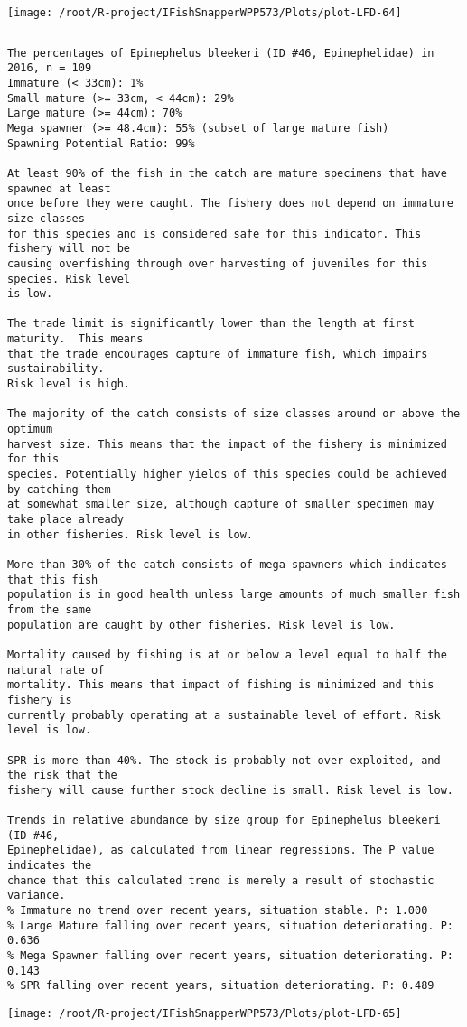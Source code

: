 \documentclass{report}\usepackage[]{graphicx}\usepackage[]{color}
\makeatletter
\def\maxwidth{ %
  \ifdim\Gin@nat@width>\linewidth
    \linewidth
  \else
    \Gin@nat@width
  \fi
}
\newenvironment{kframe}{%
 \def\at@end@of@kframe{}%
 \ifinner\ifhmode%
  \def\at@end@of@kframe{\end{minipage}}%
  \begin{minipage}{\columnwidth}%
 \fi\fi%
 \def\FrameCommand##1{\hskip\@totalleftmargin \hskip-\fboxsep
 \colorbox{shadecolor}{##1}\hskip-\fboxsep
     \hskip-\linewidth \hskip-\@totalleftmargin \hskip\columnwidth}%
 \MakeFramed {\advance\hsize-\width
   \@totalleftmargin\z@ \linewidth\hsize
   \@setminipage}}%
 {\par\unskip\endMakeFramed%
 \at@end@of@kframe}
\newenvironment{knitrout}{}{} %
\makeatother
\begin{document}
\begin{knitrout}
\texttt{[image: /root/R-project/IFishSnapperWPP573/Plots/plot-LFD-64]} 
\begin{kframe}\begin{verbatim}
\end{verbatim}
\end{kframe}
\clearpage
\newpage
\begin{kframe}\begin{verbatim}The percentages of Epinephelus bleekeri (ID #46, Epinephelidae) in 2016, n = 109
Immature (< 33cm): 1%
Small mature (>= 33cm, < 44cm): 29%
Large mature (>= 44cm): 70%
Mega spawner (>= 48.4cm): 55% (subset of large mature fish)
Spawning Potential Ratio: 99%
 
At least 90% of the fish in the catch are mature specimens that have spawned at least
once before they were caught. The fishery does not depend on immature size classes
for this species and is considered safe for this indicator. This fishery will not be
causing overfishing through over harvesting of juveniles for this species. Risk level
is low.

The trade limit is significantly lower than the length at first maturity.  This means
that the trade encourages capture of immature fish, which impairs sustainability.
Risk level is high.

The majority of the catch consists of size classes around or above the optimum
harvest size. This means that the impact of the fishery is minimized for this
species. Potentially higher yields of this species could be achieved by catching them
at somewhat smaller size, although capture of smaller specimen may take place already
in other fisheries. Risk level is low.

More than 30% of the catch consists of mega spawners which indicates that this fish
population is in good health unless large amounts of much smaller fish from the same
population are caught by other fisheries. Risk level is low.
 
Mortality caused by fishing is at or below a level equal to half the natural rate of
mortality. This means that impact of fishing is minimized and this fishery is
currently probably operating at a sustainable level of effort. Risk level is low.
 
SPR is more than 40%. The stock is probably not over exploited, and the risk that the
fishery will cause further stock decline is small. Risk level is low.
 
Trends in relative abundance by size group for Epinephelus bleekeri (ID #46,
Epinephelidae), as calculated from linear regressions. The P value indicates the
chance that this calculated trend is merely a result of stochastic variance.
% Immature no trend over recent years, situation stable. P: 1.000
% Large Mature falling over recent years, situation deteriorating. P: 0.636
% Mega Spawner falling over recent years, situation deteriorating. P: 0.143
% SPR falling over recent years, situation deteriorating. P: 0.489
\end{verbatim}
\end{kframe}
\texttt{[image: /root/R-project/IFishSnapperWPP573/Plots/plot-LFD-65]} 


\end{knitrout}
\end{document}
